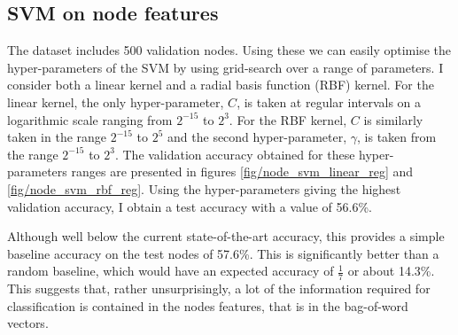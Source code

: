 \documentclass[12pt]{article}
\theoremstyle{definition}
\begin{document}
\subsection{SVM on node features}
The dataset includes 500 validation nodes. Using these we can easily optimise the hyper-parameters of the SVM by using grid-search over a range of parameters. I consider both a linear kernel and a radial basis function (RBF) kernel. For the linear kernel, the only hyper-parameter, $C$, is taken at regular intervals on a logarithmic scale ranging from $2^{-15}$ to $2^3$. For the RBF kernel, $C$ is similarly taken in the range $2^{-15}$ to $2^5$ and the second hyper-parameter, $\gamma$, is taken from the range $2^{-15}$ to $2^3$. The validation accuracy obtained for these hyper-parameters ranges are presented in figures \ref{fig/node_svm_linear_reg} and \ref{fig/node_svm_rbf_reg}. Using the hyper-parameters giving the highest validation accuracy, I obtain a test accuracy with a value of 56.6\%. 

Although well below the current state-of-the-art accuracy, this provides a simple baseline accuracy on the test nodes of 57.6\%. This is significantly better than a random baseline, which would have an expected accuracy of $\frac{1}{7}$ or about 14.3\%. This suggests that, rather unsurprisingly, a lot of the information required for classification is contained in the nodes features, that is in the bag-of-word vectors. 
\end{document}
